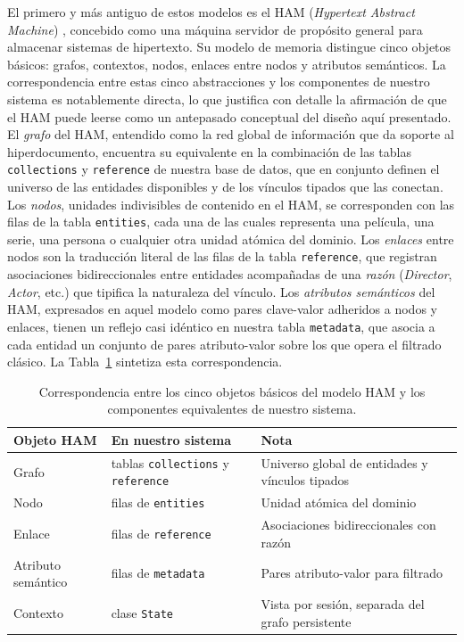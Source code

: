 El primero y más antiguo de estos modelos es el HAM (\textit{Hypertext Abstract Machine})
\citep{campbell1988ham}, concebido
como una máquina servidor de propósito general para almacenar sistemas de hipertexto. Su modelo de
memoria distingue cinco objetos básicos: grafos, contextos, nodos, enlaces entre nodos y atributos
semánticos. La correspondencia entre estas cinco abstracciones y los componentes de nuestro sistema
es notablemente directa, lo que justifica con detalle la afirmación de que el HAM puede leerse como un
antepasado conceptual del diseño aquí presentado. El \textit{grafo} del HAM, entendido como la red
global de información que da soporte al hiperdocumento, encuentra su equivalente en la combinación
de las tablas \texttt{collections} y \texttt{reference} de nuestra base de datos, que en conjunto definen
el universo de las entidades disponibles y de los vínculos tipados que las conectan. Los \textit{nodos},
unidades indivisibles de contenido en el HAM, se corresponden con las filas de la tabla
\texttt{entities}, cada una de las cuales representa una película, una serie, una persona o cualquier otra
unidad atómica del dominio. Los \textit{enlaces} entre nodos son la traducción literal de las filas de la
tabla \texttt{reference}, que registran asociaciones bidireccionales entre entidades acompañadas de una
\textit{razón} (\textit{Director}, \textit{Actor}, etc.) que tipifica la naturaleza del vínculo. Los
\textit{atributos semánticos} del HAM, expresados en aquel modelo como pares clave-valor adheridos
a nodos y enlaces, tienen un reflejo casi idéntico en nuestra tabla \texttt{metadata}, que asocia a cada
entidad un conjunto de pares atributo-valor sobre los que opera el filtrado clásico. La
Tabla~\ref{tab:hamMapping} sintetiza esta correspondencia.

\begin{table}[h]
  \centering
  \begin{tabular}{@{}p{}p{}p{}@{}}
    \toprule
    \textbf{Objeto HAM} & \textbf{En nuestro sistema} & \textbf{Nota} \\
    \midrule
    Grafo               & tablas \texttt{collections} y \texttt{reference}
                        & Universo global de entidades y vínculos tipados \\
    Nodo                & filas de \texttt{entities}
                        & Unidad atómica del dominio \\
    Enlace              & filas de \texttt{reference}
                        & Asociaciones bidireccionales con razón \\
    Atributo semántico  & filas de \texttt{metadata}
                        & Pares atributo-valor para filtrado \\
    Contexto            & clase \texttt{State}
                        & Vista por sesión, separada del grafo persistente \\
    \bottomrule
  \end{tabular}
  \caption[Correspondencia HAM]{%
    Correspondencia entre los cinco objetos básicos del modelo HAM
    \citep{campbell1988ham} y los componentes equivalentes de nuestro
    sistema.}
  \label{tab:hamMapping}
\end{table}

